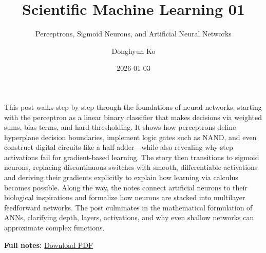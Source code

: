 \documentclass[
  letterpaper,
  DIV=11,
  numbers=noendperiod]{scrartcl}
\title{Scientific Machine Learning 01}
\subtitle{Perceptrons, Sigmoid Neurons, and Artificial Neural Networks}
\author{Donghyun Ko}
\date{2026-01-03}
\begin{document}
\maketitle


This post walks step by step through the foundations of neural networks,
starting with the perceptron as a linear binary classifier that makes
decisions via weighted sums, bias terms, and hard thresholding. It shows
how perceptrons define hyperplane decision boundaries, implement logic
gates such as NAND, and even construct digital circuits like a
half-adder---while also revealing why step activations fail for
gradient-based learning. The story then transitions to sigmoid neurons,
replacing discontinuous switches with smooth, differentiable activations
and deriving their gradients explicitly to explain how learning via
calculus becomes possible. Along the way, the notes connect artificial
neurons to their biological inspirations and formalize how neurons are
stacked into multilayer feedforward networks. The post culminates in the
mathematical formulation of ANNs, clarifying depth, layers, activations,
and why even shallow networks can approximate complex functions.

\textbf{Full notes:}
\href{../../study/files/SciML_1_Perceptrons_Sigmoid_and_ANN.pdf}{Download
PDF}
\end{document}
